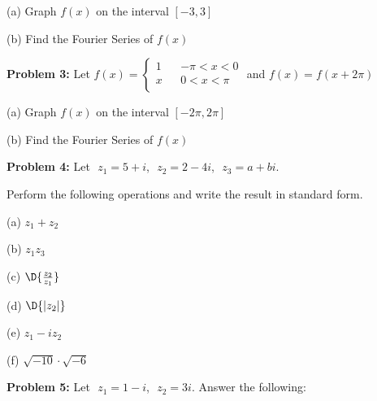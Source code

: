 \documentclass[12pt]{amsart}
\numberwithin{equation}{section}
\begin{document}
(a) Graph $f(x)$ on the interval $[-3,3]$

\vspace{7.2cm}

(b) Find the Fourier Series of $f(x)$


\thispagestyle{empty}
\newpage
\thispagestyle{empty}

{\bf Problem 3:} Let \quad 
$
f(x) = 
\left\{
\begin{array}{lrc}
	1 & &-\pi  < x <  0\\
	x & &   0  < x <  \pi\\
\end{array}
\right.
$ \quad and \quad $f(x) = f(x+2\pi)$

(a) Graph $f(x)$ on the interval $[-2\pi,2\pi]$

\vspace{7.2cm}

(b) Find the Fourier Series of $f(x)$

\thispagestyle{empty}
\newpage
\thispagestyle{empty}

{\bf Problem 4:} Let \,\,$z_1 = 5+i$,\,\, $z_2 = 2-4i$,\,\, $z_3 = a+bi$.  

Perform the following operations and write the result in standard form.

\vspace{0.5cm}

(a) \quad $z_1 + z_2$

\vspace{3.5cm}

(b) \quad $z_1 z_3$

\vspace{3.5cm}

(c) \quad $\D{\frac{z_2}{z_1}}$

\vspace{3.5cm}

(d) \quad $\D{|z_2|}$

\vspace{3.5cm}

(e) \quad $z_1 - iz_2$

\vspace{3.5cm}

(f) \quad $\sqrt{-10}\cdot\sqrt{-6}$


\thispagestyle{empty}
\newpage
\thispagestyle{empty}

{\bf Problem 5:} Let \,\,$z_1 = 1-i$,\,\, $z_2 = 3i$. \quad Answer the following:

\vspace{0.2cm}
\end{document}
